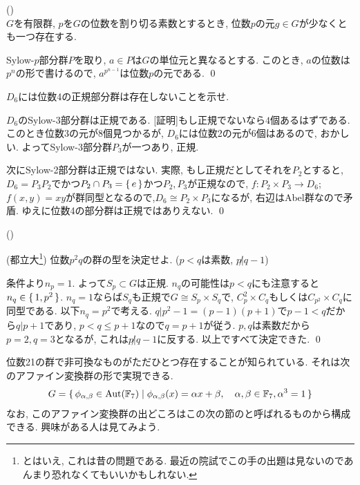 \begin{cor} ()\\
$G$を有限群, $p$を$G$の位数を割り切る素数とするとき, 位数$p$の元$g\in G$が少なくとも一つ存在する.
\end{cor}
\prf Sylow-$p$部分群$P$を取り, $a\in P$は$G$の単位元と異なるとする. このとき, $a$の位数は$p^{n}$の形で書けるので, $a^{p^{n-1}}$は位数$p$の元である. \qed


\begin{egprob}
$D_6$には位数4の正規部分群は存在しないことを示せ.
\end{egprob}
\begin{egans}
$D_6$のSylow-3部分群は正規である. [証明]もし正規でないなら$4$個あるはずである. このとき位数3の元が8個見つかるが, $D_6$には位数2の元が$6$個はあるので, おかしい. よってSylow-3部分群$P_3$が一つあり, 正規.\par 次にSylow-2部分群は正規ではない. 実際, もし正規だとしてそれを$P_2$とすると, $D_6 = P_3P_2$でかつ$P_2\cap P_3 = \set{e}$かつ$P_2,P_3$が正規なので, $f:P_2\times P_3 \to D_6$; $f(x,y) = xy$が群同型となるので,$D_6\cong P_2\times P_3$になるが, 右辺はAbel群なので矛盾. ゆえに位数4の部分群は正規ではありえない. \qed
\end{egans}



\begin{eg} ()

\end{eg}

\begin{egprob} (都立大\footnote{とはいえ, これは昔の問題である.  最近の院試でこの手の出題は見ないのであんまり恐れなくてもいいかもしれない. })
位数$p^2q$の群の型を決定せよ. ($p<q$は素数, $p\not| q-1$)
\end{egprob}

\begin{egans}
条件より$n_p = 1$. よって$S_p\subset G$は正規. $n_q$の可能性は$p<q$にも注意すると$n_q \in \set{1,p^2}$. $n_q = 1$ならば$S_q$も正規で$G\cong S_p\times S_q$で, $C_{p}^2 \times C_q$もしくは$C_{p^2}\times C_q$に同型である. 以下$n_q = p^2$で考える. $q|p^2-1 = (p-1)(p+1)$で$p-1<q$だから$q|p+1$であり, $p<q\leq p+1$なので$q=p+1$が従う. $p,q$は素数だから$p=2,q=3$となるが, これは$p\not| q-1$に反する. 以上ですべて決定できた. \qed
\end{egans}

\begin{eg}
位数21の群で非可換なものがただひとつ存在することが知られている. それは次のアファイン変換群の形で実現できる.
\[G=\set{\phi_{\alpha,\beta}\in \mathrm{Aut}(\mathbb{F}_{7})\mid  \phi_{\alpha,\beta}(x) = \alpha x + \beta,\quad \alpha,\beta\in \mathbb{F}_{7},\alpha^3=1}\]
なお, このアファイン変換群の出どころはこの次の節のと呼ばれるものから構成できる. 興味がある人は見てみよう.
\end{eg}

